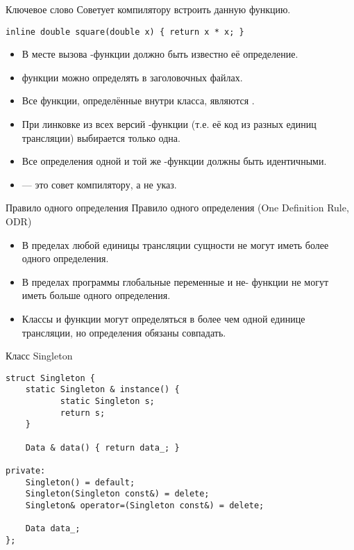 \documentclass{beamer}
\begin{document}
\begin{frame}[fragile]{Ключевое слово }
    Советует компилятору встроить данную функцию.
\begin{lstlisting}
inline double square(double x) { return x * x; }
\end{lstlisting}
\begin{itemize}
    \item В месте вызова -функции должно 
        быть известно её определение.

    \item {} функции можно определять 
        в заголовочных файлах.

    \item Все функции, определённые внутри класса, являются
        .

    \item При линковке из всех версий -функции
        (т.е. её код из разных единиц трансляции)
        выбирается только одна.

    \item Все определения одной и той же -функции
        должны быть идентичными.

    \item {} — это совет компилятору, а не указ.
\end{itemize}
\end{frame}

\begin{frame}[fragile]{Правило одного определения}
Правило одного определения (One Definition Rule, ODR)
\begin{itemize}
    \item В пределах любой единицы трансляции сущности не могут иметь более одного определения. 
    \item В пределах программы глобальные переменные и не- функции не могут иметь больше
        одного определения.
    \item Классы и  функции могут определяться в более чем одной единице
        трансляции, но определения обязаны совпадать.
\end{itemize}
\end{frame}

\begin{frame}[fragile]{Класс Singleton}
\begin{lstlisting}
struct Singleton {
    static Singleton & instance() {
           static Singleton s;
           return s;
    }

    Data & data() { return data_; }

private:
    Singleton() = default;
    Singleton(Singleton const&) = delete;
    Singleton& operator=(Singleton const&) = delete;

    Data data_;
};
\end{lstlisting}
\end{frame}
\end{document}
